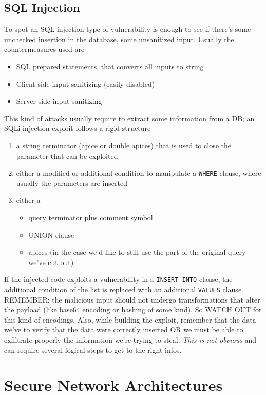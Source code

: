 \documentclass{article}
\begin{document}
			\subsection{SQL Injection}
				To spot an SQL injection type of vulnerability is enough to see if there's some unchecked insertion in the database, some unsanitized input. Usually the countermeasures used are
				\begin{itemize}
					\item SQL prepared statements, that converts all inputs to string
					\item Client side input sanitizing (easily disabled)
					\item Server side input sanitizing 
				\end{itemize}
				This kind of attacks usually require to extract some information from a DB; an SQLi injection exploit follows a rigid structure
				\begin{enumerate}
					\item a string terminator (apice or double apices) that is used to close the parameter that can be exploited
					\item either a modified or additional condition to manipulate a \verb|WHERE| clause, where usually the parameters are inserted
					\item either a 
						\begin{itemize}
							\item query terminator plus comment symbol
							\item UNION clause
							\item apices (in the case we'd like to still use the part of the original query we've cut out)
						\end{itemize}
				\end{enumerate}
				If the injected code exploits a vulnerability in a \verb|INSERT INTO| clause, the additional condition of the list is replaced with an additional \verb|VALUES| clause.\\
				REMEMBER: the malicious input should not undergo transformations that alter the payload (like base64 encoding or hashing of some kind). So WATCH OUT for this kind of encodings. Also, while building the exploit, remember that the data we've to verify that the data were correctly inserted OR we must be able to exfiltrate properly the information we're trying to steal. \emph{This is not obvious} and can require several logical steps to get to the right infos.
				
		\section{Secure Network Architectures}
\end{document}

